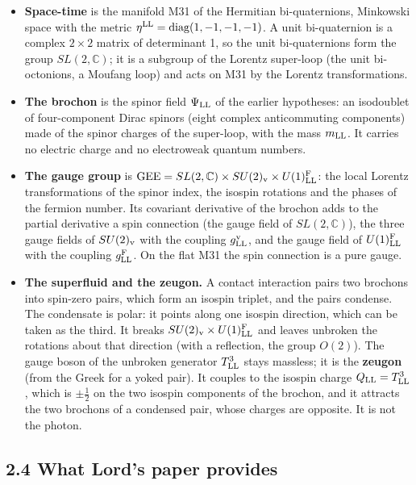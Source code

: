 \documentclass[
  10pt,
]{article}
\providecommand{\tightlist}{%
  \setlength{\itemsep}{0pt}\setlength{\parskip}{0pt}}
\begin{document}
\begin{itemize}
\tightlist
\item
  \textbf{Space-time} is the manifold M31 of the Hermitian
  bi-quaternions, Minkowski space with the metric
  \(\eta^{\rm LL}=\mathrm{diag}(1,-1,-1,-1)\). A unit bi-quaternion is a
  complex \(2\times2\) matrix of determinant 1, so the unit
  bi-quaternions form the group \(SL(2,\mathbb C)\); it is a subgroup of
  the Lorentz super-loop (the unit bi-octonions, a Moufang loop) and
  acts on M31 by the Lorentz transformations.
\item
  \textbf{The brochon} is the spinor field \(\Psi_{\rm LL}\) of the
  earlier hypotheses: an isodoublet of four-component Dirac spinors
  (eight complex anticommuting components) made of the spinor charges of
  the super-loop, with the mass \(m_{\rm LL}\). It carries no electric
  charge and no electroweak quantum numbers.
\item
  \textbf{The gauge group} is
  \(\mathrm{GEE}=SL(2,\mathbb C)\times SU(2)_{\rm v}\times U(1)^{\rm F}_{\rm LL}\):
  the local Lorentz transformations of the spinor index, the isospin
  rotations and the phases of the fermion number. Its covariant
  derivative of the brochon adds to the partial derivative a spin
  connection (the gauge field of \(SL(2,\mathbb C)\)), the three gauge
  fields of \(SU(2)_{\rm v}\) with the coupling \(g^{\rm v}_{\rm LL}\),
  and the gauge field of \(U(1)^{\rm F}_{\rm LL}\) with the coupling
  \(g^{\rm F}_{\rm LL}\). On the flat M31 the spin connection is a pure
  gauge.
\item
  \textbf{The superfluid and the zeugon.} A contact interaction pairs
  two brochons into spin-zero pairs, which form an isospin triplet, and
  the pairs condense. The condensate is polar: it points along one
  isospin direction, which can be taken as the third. It breaks
  \(SU(2)_{\rm v}\times U(1)^{\rm F}_{\rm LL}\) and leaves unbroken the
  rotations about that direction (with a reflection, the group
  \(O(2)\)). The gauge boson of the unbroken generator \(T^3_{\rm LL}\)
  stays massless; it is the \textbf{zeugon} (from the Greek for a yoked
  pair). It couples to the isospin charge \(Q_{\rm LL}=T^3_{\rm LL}\),
  which is \(\pm\tfrac12\) on the two isospin components of the brochon,
  and it attracts the two brochons of a condensed pair, whose charges
  are opposite. It is not the photon.
\end{itemize}

\hypertarget{what-lords-paper-provides}{%
\subsection{2.4 What Lord's paper
provides}\label{what-lords-paper-provides}}
\end{document}
